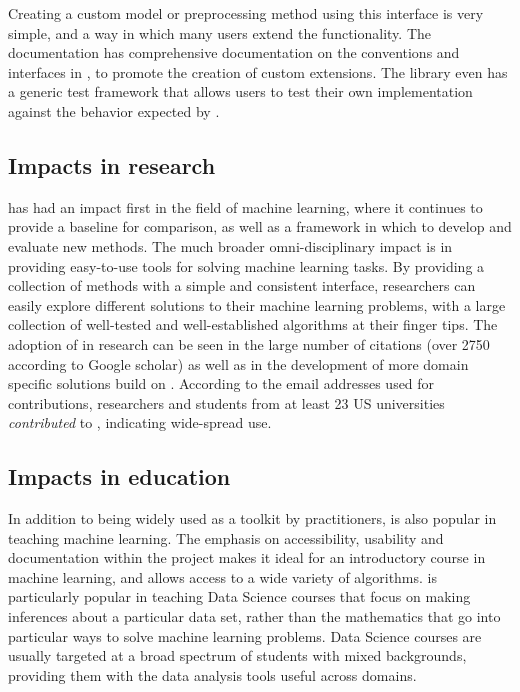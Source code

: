 Creating a custom model or preprocessing method using this interface is very simple,
and a way in which many users extend the functionality. The \sklearn{} documentation
has comprehensive documentation on the conventions and interfaces in \sklearn{},
to promote the creation of custom extensions.
The \sklearn{} library even has a generic test framework that allows users to
test their own implementation against the behavior expected by \sklearn{}.

\subsection{Impacts in research}
\sklearn{} has had an impact first in the field of machine learning,
where it continues to provide a baseline for comparison, as well as a
framework in which to develop and evaluate new methods.
The much broader omni-disciplinary impact is in providing easy-to-use
tools for solving machine learning tasks. By providing a collection
of methods with a simple and consistent interface, researchers
can easily explore different solutions to their machine learning problems,
with a large collection of well-tested and well-established algorithms
at their finger tips.
The adoption of \sklearn{} in research can be seen in the large number
of citations (over 2750 according to Google scholar) as well as in the development
of more domain specific solutions build on \sklearn{}.
According to the email addresses used for contributions, researchers and students
from at least 23 US universities \emph{contributed} to \sklearn{}, indicating wide-spread use.

\subsection{Impacts in education}
In addition to being widely used as a toolkit by practitioners,
\sklearn{} is also popular in teaching machine learning.
The emphasis on accessibility, usability and documentation within
the \sklearn{} project makes it ideal for an introductory
course in machine learning, and allows access to a wide variety
of algorithms. \sklearn{} is particularly popular in teaching
Data Science courses that focus on making inferences about
a particular data set, rather than the mathematics that go into
particular ways to solve machine learning problems.
Data Science courses are usually targeted at a broad spectrum
of students with mixed backgrounds, providing them
with the data analysis tools useful across domains.

